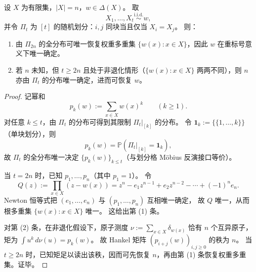 \begin{theorem}[有限样本相等模式分布在 \texorpdfstring{$t=2n$}{t=2n} 的完备可识别性]\label{thm:xi-equality-pattern-2n-complete-identifiability}
设 \(X\) 为有限集，\(|X|=n\)，\(w\in\Delta(X)\)。
取
\[
X_1,\dots,X_t\stackrel{\mathrm{i.i.d.}}{\sim}w,
\]
并令 \(\Pi_t\) 为 \([t]\) 的随机划分：\(i,j\) 同块当且仅当 \(X_i=X_j\)。
则：
\begin{enumerate}
  \item 由 \(\Pi_{2n}\) 的全分布可唯一恢复权重多重集 \(\{w(x):x\in X\}\)，因此 \(w\) 在重标号意义下唯一确定。
  \item 若 \(n\) 未知，但 \(t\ge 2n\) 且处于非退化情形（\(\{w(x):x\in X\}\) 两两不同），则 \(n\) 亦由 \(\Pi_t\) 的分布唯一确定，进而可恢复 \(w\)。
\end{enumerate}
\end{theorem}
\begin{proof}
记幂和
\[
p_k(w):=\sum_{x\in X}w(x)^k\qquad(k\ge 1).
\]
对任意 \(k\le t\)，由 \(\Pi_t\) 的分布可得到其限制 \(\Pi_t|_{[k]}\) 的分布。
令 \(\mathbf 1_k:=\{\{1,\dots,k\}\}\)（单块划分），则
\[
p_k(w)=\mathbb P\!\left(\Pi_t|_{[k]}=\mathbf 1_k\right),
\]
故 \(\Pi_t\) 的全分布唯一决定 \(\{p_k(w)\}_{k\le t}\)（与划分格 Möbius 反演接口等价）。
\par
当 \(t=2n\) 时，已知 \(p_1,\dots,p_n\)（其中 \(p_1=1\)）。
令
\[
Q(z):=\prod_{x\in X}(z-w(x))
=z^n-e_1z^{n-1}+e_2z^{n-2}-\cdots+(-1)^n e_n.
\]
Newton 恒等式把 \((e_1,\dots,e_n)\) 与 \((p_1,\dots,p_n)\) 互相唯一确定，
故 \(Q\) 唯一，从而根多重集 \(\{w(x):x\in X\}\) 唯一。
这给出第 (1) 条。
\par
对第 (2) 条，在非退化假设下，原子测度
\(
\nu:=\sum_{x\in X}\delta_{w(x)}
\)
恰有 \(n\) 个互异原子，矩为 \(\int u^k\,d\nu(u)=p_k(w)\)。
故 Hankel 矩阵 \((p_{i+j}(w))_{i,j\ge 0}\) 的秩为 \(n\)。
当 \(t\ge 2n\) 时，已知矩足以读出该秩，因而可先恢复 \(n\)，再由第 (1) 条恢复权重多重集。证毕。
\end{proof}




\endinput
